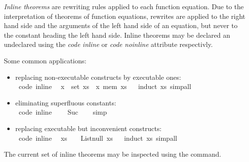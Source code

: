 \begin{isabellebody}
\begin{isamarkuptext}
  \emph{Inline theorems} are rewriting rules applied to each
  function equation.  Due to the interpretation of theorems
  of function equations, rewrites are applied to the right
  hand side and the arguments of the left hand side of an
  equation, but never to the constant heading the left hand side.
  Inline theorems may be declared an undeclared using the
  \emph{code inline} or \emph{code noinline} attribute respectivly.

  Some common applications:%
\end{isamarkuptext}%
\isamarkuptrue%
%
\begin{itemize}
     \item replacing non-executable constructs by executable ones: \\
\isamarkupfalse%
\ {\isacharbrackleft}code\ inline{\isacharbrackright}{\isacharcolon}\isanewline
\ \ {\isachardoublequoteopen}x\ {\isasymin}\ set\ xs\ {\isasymlongleftrightarrow}\ x\ mem\ xs{\isachardoublequoteclose}%
\isadelimproof
\ %
\endisadelimproof
%
\isatagproof
{}\isamarkupfalse%
\ {\isacharparenleft}induct\ xs{\isacharparenright}\ simp{\isacharunderscore}all%
\endisatagproof
{\isafoldproof}%
%
\isadelimproof
%
\endisadelimproof
%
\item eliminating superfluous constants: \\
\isamarkupfalse%
\ {\isacharbrackleft}code\ inline{\isacharbrackright}{\isacharcolon}\isanewline
\ \ {\isachardoublequoteopen}{}\ {\isacharequal}\ Suc\ {}{\isachardoublequoteclose}%
\isadelimproof
\ %
\endisadelimproof
%
\isatagproof
{}\isamarkupfalse%
\ simp%
\endisatagproof
{\isafoldproof}%
%
\isadelimproof
%
\endisadelimproof
%
\item replacing executable but inconvenient constructs: \\
\isamarkupfalse%
\ {\isacharbrackleft}code\ inline{\isacharbrackright}{\isacharcolon}\isanewline
\ \ {\isachardoublequoteopen}xs\ {\isacharequal}\ {\isacharbrackleft}{\isacharbrackright}\ {\isasymlongleftrightarrow}\ List{\isachardot}null\ xs{\isachardoublequoteclose}%
\isadelimproof
\ %
\endisadelimproof
%
\isatagproof
{}\isamarkupfalse%
\ {\isacharparenleft}induct\ xs{\isacharparenright}\ simp{\isacharunderscore}all%
\endisatagproof
{\isafoldproof}%
%
\isadelimproof
%
\endisadelimproof
%
\end{itemize}
%
\begin{isamarkuptext}%
The current set of inline theorems may be inspected using
  the \isasymPRINTCODETHMS command.


\end{isamarkuptext}
\end{isabellebody}
